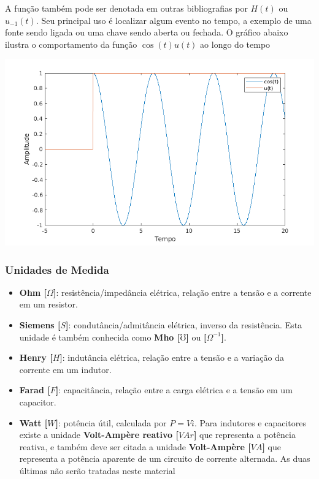 \documentclass{article}
\numberwithin{equation}{section}
\begin{document}
    A função também pode ser denotada em outras bibliografias por $H(t)$ ou $u_{-1}(t)$. Seu principal uso é localizar algum evento no tempo, a exemplo de uma fonte sendo ligada ou uma chave sendo aberta ou fechada. O gráfico abaixo ilustra o comportamento da função $\cos (t)u(t)$ ao longo do tempo

    \begin{center}
        \includegraphics[width=\textwidth]{img/cos(t).png}
    \end{center}

    \subsubsection{Unidades de Medida}
    \begin{itemize}
        \item \textbf{Ohm [$\Omega$]}: resistência/impedância elétrica, relação entre a tensão e a corrente em um resistor.
        \item \textbf{Siemens [$S$]}: condutância/admitância elétrica, inverso da resistência. Esta unidade é também conhecida como \textbf{Mho [$\mho$]} ou \textbf{[$\Omega^{-1}$]}.
        \item \textbf{Henry [$H$]}: indutância elétrica, relação entre a tensão e a variação da corrente em um indutor.
        \item \textbf{Farad [$F$]}: capacitância, relação entre a carga elétrica e a tensão em um capacitor.
        \item \textbf{Watt [$W$]}: potência útil, calculada por $P=Vi$. Para indutores e capacitores existe a unidade \textbf{Volt-Ampère reativo [$VAr$]} que representa a potência reativa, e também deve ser citada a unidade \textbf{Volt-Ampère [$VA$]} que representa a potência aparente de um circuito de corrente alternada. As duas últimas não serão tratadas neste material
    \end{itemize}
\end{document}
